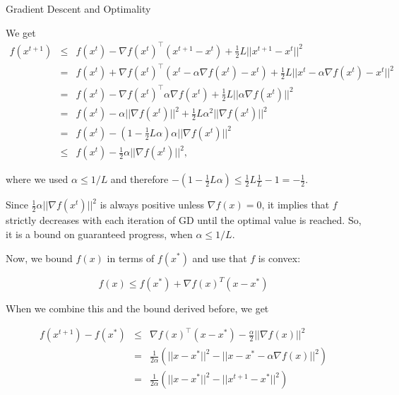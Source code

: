 \documentclass[11pt,compress,t,notes=noshow, xcolor=table]{beamer}
\begin{document}
		\begin{vbframe}{Gradient Descent and Optimality}
			\begin{footnotesize}
			
			We get
			\vspace*{-0.3cm}
			\begin{eqnarray*}
			f(x^{t+1}) &\leq& f(x^t) - \nabla f(x^t)^\top(x^{t+1} - x^t) + \frac{1}{2}L ||x^{t+1} - x^t||^2 \\
			&=& f(x^t) + \nabla f(x^t)^\top(x^t - \alpha \nabla f(x^t) - x^t) + \frac{1}{2}L ||x^{t} - \alpha \nabla f(x^t) - x^t||^2 \\
			& = & f(x^t) - \nabla f(x^t)^\top \alpha  \nabla f(x^t) + \frac{1}{2}L ||\alpha \nabla f(x^t)||^2 \\
			&=& f(x^t) - \alpha ||\nabla f(x^t)||^2 + \frac{1}{2}L\alpha^2 ||\nabla f(x^t)||^2 \\
			&=& f(x^t) - (1 - \frac{1}{2} L \alpha)\alpha  ||\nabla f(x^t)||^2 \\
			&\le& f(x^t) - \frac{1}{2}\alpha ||\nabla f(x^t)||^2, 
			\end{eqnarray*}
		
			where we used $\alpha \leq 1/L$ and therefore $- (1 - \frac{1}{2} L \alpha) \leq \frac{1}{2} L \frac{1}{L} -1 = -\frac{1}{2}$.
						
			Since $\frac{1}{2} \alpha ||\nabla f(x^t)||^2$ is always positive unless $\nabla f(x) = 0$, it implies that $f$ strictly decreases with each iteration of GD until the optimal value is reached. So, it is a bound on guaranteed progress, when $\alpha \leq 1/L$. 
			\end{footnotesize}
			
			\framebreak
			
			Now, we bound $f(x)$ in terms of $f(x^*)$ and use that $f$ is convex: 
			
			$$
			f(x) \leq f(x^*) + \nabla f(x)^T (x - x^*)
			$$ 
			
			When we combine this and the bound derived before, we get
			
			\begin{eqnarray*}
				f(x^{t+1}) - f(x^*) &\leq& \nabla f(x)^\top (x-x^*) - \frac{\alpha}{2}||\nabla f(x)||^2 \\
				&=& \frac{1}{2 \alpha} \left( ||x-x^*||^2 - || x - x^* - \alpha \nabla f(x)||^2 \right) \\
				&=& \frac{1}{2 \alpha} \left( ||x-x^*||^2 - || x^{t+1} - x^* ||^2 \right)
			\end{eqnarray*}
		

\end{vbframe}
\end{document}
